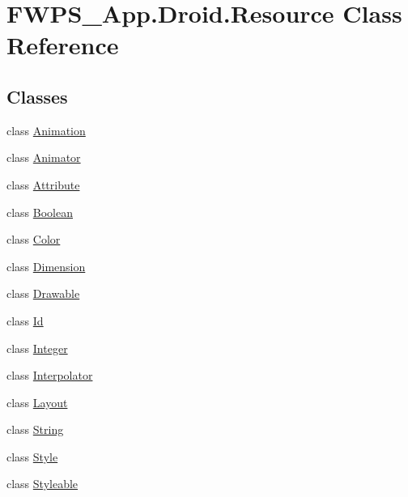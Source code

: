 \hypertarget{class_f_w_p_s___app_1_1_droid_1_1_resource}{}\section{F\+W\+P\+S\+\_\+\+App.\+Droid.\+Resource Class Reference}
\label{class_f_w_p_s___app_1_1_droid_1_1_resource}
\subsection*{Classes}
\begin{DoxyCompactItemize}
\item 
class \mbox{\hyperlink{class_f_w_p_s___app_1_1_droid_1_1_resource_1_1_animation}{Animation}}
\item 
class \mbox{\hyperlink{class_f_w_p_s___app_1_1_droid_1_1_resource_1_1_animator}{Animator}}
\item 
class \mbox{\hyperlink{class_f_w_p_s___app_1_1_droid_1_1_resource_1_1_attribute}{Attribute}}
\item 
class \mbox{\hyperlink{class_f_w_p_s___app_1_1_droid_1_1_resource_1_1_boolean}{Boolean}}
\item 
class \mbox{\hyperlink{class_f_w_p_s___app_1_1_droid_1_1_resource_1_1_color}{Color}}
\item 
class \mbox{\hyperlink{class_f_w_p_s___app_1_1_droid_1_1_resource_1_1_dimension}{Dimension}}
\item 
class \mbox{\hyperlink{class_f_w_p_s___app_1_1_droid_1_1_resource_1_1_drawable}{Drawable}}
\item 
class \mbox{\hyperlink{class_f_w_p_s___app_1_1_droid_1_1_resource_1_1_id}{Id}}
\item 
class \mbox{\hyperlink{class_f_w_p_s___app_1_1_droid_1_1_resource_1_1_integer}{Integer}}
\item 
class \mbox{\hyperlink{class_f_w_p_s___app_1_1_droid_1_1_resource_1_1_interpolator}{Interpolator}}
\item 
class \mbox{\hyperlink{class_f_w_p_s___app_1_1_droid_1_1_resource_1_1_layout}{Layout}}
\item 
class \mbox{\hyperlink{class_f_w_p_s___app_1_1_droid_1_1_resource_1_1_string}{String}}
\item 
class \mbox{\hyperlink{class_f_w_p_s___app_1_1_droid_1_1_resource_1_1_style}{Style}}
\item 
class \mbox{\hyperlink{class_f_w_p_s___app_1_1_droid_1_1_resource_1_1_styleable}{Styleable}}
\end{DoxyCompactItemize}
